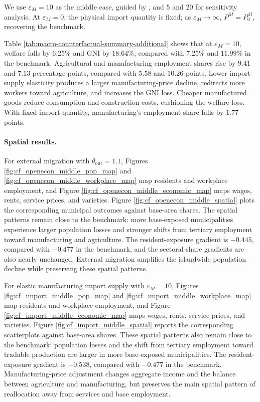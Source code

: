 \documentclass[12pt, unicode, a4paper]{article}
\newcommand{\1}{\mbox{1}\hspace{-0.25em}\mbox{l}} %
\begin{document}
We use $\varepsilon_M=10$ as the middle case, guided by , and $5$ and $20$ for sensitivity analysis. At $\varepsilon_M=0$, the physical import quantity is fixed; as $\varepsilon_M\rightarrow\infty$, $P^M=P_0^M$, recovering the benchmark.


Table \ref{tab:macro-counterfactual-summary-additional} shows that at $\varepsilon_M=10$, welfare falls by $6.25\%$ and GNI by $18.64\%$, compared with $7.25\%$ and $11.99\%$ in the benchmark. Agricultural and manufacturing employment shares rise by $9.41$ and $7.13$ percentage points, compared with $5.58$ and $10.26$ points. Lower import-supply elasticity produces a larger manufacturing-price decline, redirects more workers toward agriculture, and increases the GNI loss. Cheaper manufactured goods reduce consumption and construction costs, cushioning the welfare loss. With fixed import quantity, manufacturing's employment share falls by $1.77$ points.

\paragraph{Spatial results.}

For external migration with $\theta_{\mathrm{out}}=1.1$, Figures \ref{fig:cf_openecon_middle_pop_map} and \ref{fig:cf_openecon_middle_workplace_map} map residents and workplace employment, and Figure \ref{fig:cf_openecon_middle_economic_map} maps wages, rents, service prices, and varieties. Figure \ref{fig:cf_openecon_middle_spatial} plots the corresponding municipal outcomes against base-area shares. The spatial patterns remain close to the benchmark: more base-exposed municipalities experience larger population losses and stronger shifts from tertiary employment toward manufacturing and agriculture. The resident-exposure gradient is $-0.445$, compared with $-0.477$ in the benchmark, and the sectoral-share gradients are also nearly unchanged. External migration amplifies the islandwide population decline while preserving these spatial patterns.

For elastic manufacturing import supply with $\varepsilon_M=10$, Figures \ref{fig:cf_import_middle_pop_map} and \ref{fig:cf_import_middle_workplace_map} map residents and workplace employment, and Figure \ref{fig:cf_import_middle_economic_map} maps wages, rents, service prices, and varieties. Figure \ref{fig:cf_import_middle_spatial} reports the corresponding scatterplots against base-area shares. These spatial patterns also remain close to the benchmark: population losses and the shift from tertiary employment toward tradable production are larger in more base-exposed municipalities. The resident-exposure gradient is $-0.538$, compared with $-0.477$ in the benchmark. Manufacturing-price adjustment changes aggregate income and the balance between agriculture and manufacturing, but preserves the main spatial pattern of reallocation away from services and base employment.
\end{document}

